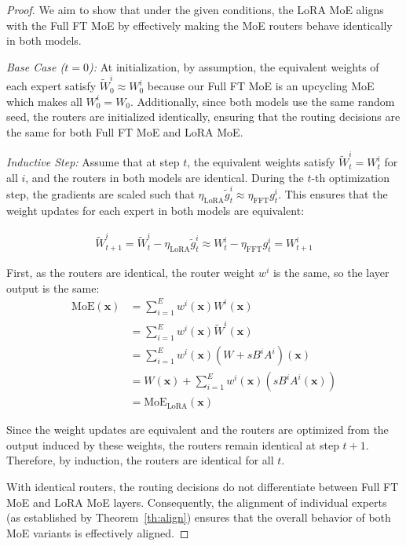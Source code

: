 \begin{proof}
We aim to show that under the given conditions, the LoRA MoE aligns with the Full FT MoE by effectively making the MoE routers behave identically in both models.

\textit{Base Case (\( t = 0 \)):}  
At initialization, by assumption, the equivalent weights of each expert satisfy \( \tilde{W}^i_0 \approx W^i_0 \) because our Full FT MoE is an upcycling MoE which makes all \( W^i_0 = W_0\). Additionally, since both models use the same random seed, the routers are initialized identically, ensuring that the routing decisions are the same for both Full FT MoE and LoRA MoE.

\textit{Inductive Step:}  
Assume that at step \( t \), the equivalent weights satisfy \( \tilde{W}^i_t = W^i_t \) for all \( i \), and the routers in both models are identical. During the \( t \)-th optimization step, the gradients are scaled such that \( \eta_{\text{LoRA}}\tilde{g}^i_t \approx \eta_{\text{FFT}}g^i_t \). This ensures that the weight updates for each expert in both models are equivalent:

\begin{align}
\tilde{W}^i_{t+1} = \tilde{W}^i_t - \eta_{\text{LoRA}}\tilde{g}^i_t \approx W^i_t - \eta_{\text{FFT}}g^i_t = W^i_{t+1}
\end{align}

First, as the routers are identical, the router weight $w^i$ is the same, so the layer output is the same:
\begin{align}
    \mathrm{MoE}(\mathbf{x}) &= \sum_{i=1}^E w^i(\mathbf{x}) W^i(\mathbf{x})\\
    &= \sum_{i=1}^E w^i(\mathbf{x}) \tilde{W}^i (\mathbf{x}) \\
    &= \sum_{i=1}^E w^i(\mathbf{x}) (W + s B^i A^i) (\mathbf{x}) \\
    &= W(\mathbf{x}) + \sum_{i=1}^E w^i(\mathbf{x}) \left( s B^i A^i (\mathbf{x}) \right) \\
    &= \mathrm{MoE}_{\text{LoRA}}(\mathbf{x})
\end{align}

Since the weight updates are equivalent and the routers are optimized from the output induced by these weights, the routers remain identical at step \( t+1 \). Therefore, by induction, the routers are identical for all \( t \).

With identical routers, the routing decisions do not differentiate between Full FT MoE and LoRA MoE layers. Consequently, the alignment of individual experts (as established by Theorem~\ref{th:align}) ensures that the overall behavior of both MoE variants is effectively aligned.

\end{proof} 

